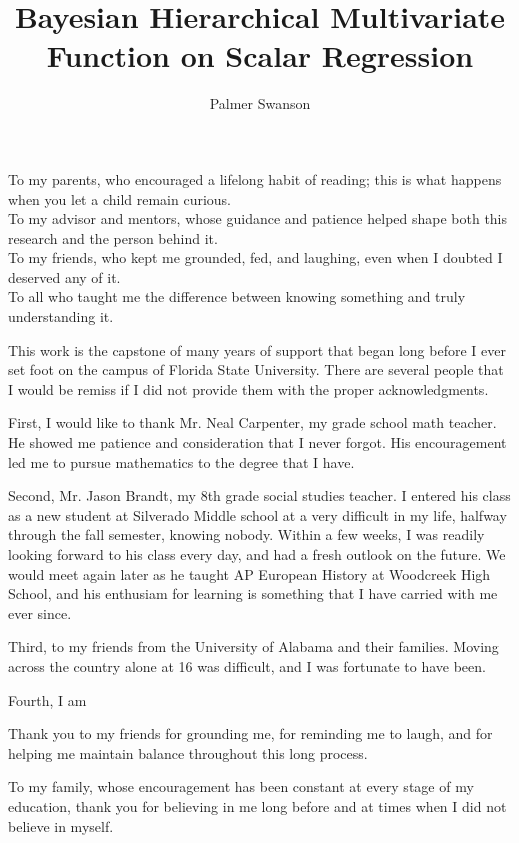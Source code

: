 \documentclass[11pt,expanded,copyright]{template/fsuthesis}
\title{Bayesian Hierarchical Multivariate Function on Scalar Regression}
\author{Palmer Swanson}
\begin{document}
\frontmatter
\maketitle
\makecommitteepage

\begin{dedication}
    \centering 
    To my parents, who encouraged a lifelong habit of reading; this is what happens when you let a child remain curious.\\[6pt]
    To my advisor and mentors, whose guidance and patience helped shape both this research and the person behind it.\\[6pt]
    To my friends, who kept me grounded, fed, and laughing, even when I doubted I deserved any of it.\\[6pt]
    To all who taught me the difference between knowing something and truly understanding it.\\
\end{dedication}
\begin{acknowledgments}
    This work is the capstone of many years of support that began long before I ever set foot on the campus of Florida State University.
    There are several people that I would be remiss if I did not provide them with the proper acknowledgments.
    
    First, I would like to thank Mr. Neal Carpenter, my grade school math teacher.  He showed me patience and consideration that I
    never forgot.  His encouragement led me to pursue mathematics to the degree that I have.

    Second, Mr. Jason Brandt, my 8th grade social studies teacher.  I entered his class as a new student at Silverado Middle school 
    at a very difficult in my life, halfway through the fall semester, knowing nobody.  Within a few weeks, I was readily looking forward
    to his class every day, and had a fresh outlook on the future.  We would meet again later as he taught AP European History at 
    Woodcreek High School, and his enthusiam for learning is something that I have carried with me ever since.  

    Third, to my friends from the University of Alabama and their families.  Moving across the country alone at 16 was difficult, and I was
    fortunate to have been.

    Fourth, I am

    Thank you to my friends for grounding me, for reminding me to laugh, and for helping me maintain balance throughout this long process.  
    
    To my family, whose encouragement has been constant at every stage of my education, thank you for believing in 
    me long before and at times when I did not believe in myself.


\end{acknowledgments}
\end{document}
